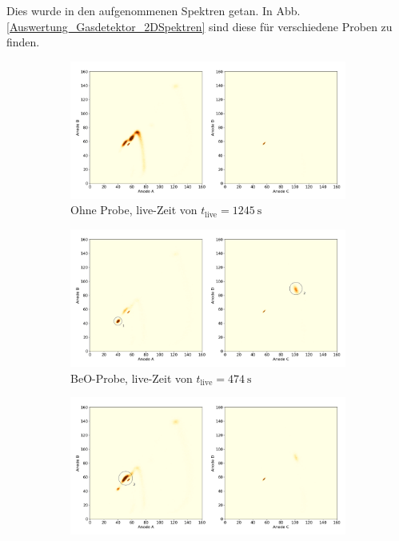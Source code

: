 Dies wurde in den aufgenommenen Spektren getan.
In Abb. \ref{Auswertung_Gasdetektor_2DSpektren} sind diese für verschiedene Proben zu finden.
\begin{figure}[h]
    \begin{subfigure}{0.95\textwidth}
        \centering
        \includegraphics[width=0.95\linewidth]{Pictures/Gasdetektor/Gasdetektor_2DSpektrum_3.png}
        \caption{Ohne Probe, live-Zeit von $t_{\text{live}} = \SI{1245}{\second}$}
    \end{subfigure}
    \begin{subfigure}{0.95\textwidth}
        \centering
        \includegraphics[width=0.95\linewidth]{Pictures/Gasdetektor/Gasdetektor_2DSpektrum_22.png}
        \caption{BeO-Probe, live-Zeit von $t_{\text{live}} = \SI{474}{\second}$}
    \end{subfigure}
    \begin{subfigure}{0.95\textwidth}
        \centering
        \includegraphics[width=0.95\linewidth]{Pictures/Gasdetektor/Gasdetektor_2DSpektrum_19.png}

\end{subfigure}
\end{figure}
